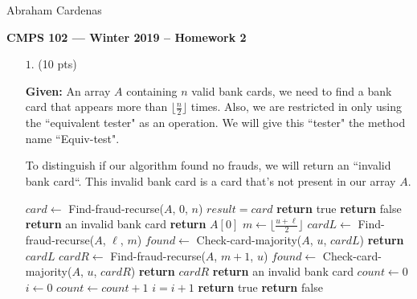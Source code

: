 \documentclass[11pt]{article}
\begin{document}
\hfill Abraham Cardenas

\begin{center}
{\bf\Large CMPS 102 --- Winter 2019 --  Homework 2}
\end{center}

\renewcommand{\P}{\mbox{IH}}

\begin{itemize}

\item[$1.$] (10 pts)

{\bf Given:} An array $A$ containing $n$ valid bank cards, we need to find a bank card that appears more than $\lfloor \frac{n}{2} \rfloor$ times. Also, we are restricted in only using the ``equivalent tester" as an operation. We will give this ``tester" the method name ``Equiv-test".

To distinguish if our algorithm found no frauds, we will return an ``invalid bank card``. This invalid bank card is a card that's not present in our array $A$.

\begin{algorithmic}[1]
 
	\State $card \gets$ Find-fraud-recurse($A$, 0, $n$)
		\State $result = card$
		\State \textbf{return} true
	\Else
		\State \textbf{return} false
	\EndIf
\EndFunction
{}
	\State \textbf{return} an invalid bank card 
	\State \textbf{return} $A[0]$
\Else
	\State ${m \gets \lfloor \frac{u + \ell}{2} \rfloor}$
	\State ${cardL \gets}$ Find-fraud-recurse($A$, $\ell$, $m$)
		\State $found \gets$ Check-card-majority($A$, $u$, $cardL$)
			\State \textbf{return} $cardL$
		\EndIf
	\EndIf
	\State ${cardR \gets}$ Find-fraud-recurse($A$, $m+1$, $u$)
			\State $found \gets$ Check-card-majority($A$, $u$, $cardR$)
				\State \textbf{return} $cardR$
			\EndIf
     	\EndIf
	\State \textbf{return} an invalid bank card
\EndIf
\EndFunction
{}
\State $count \gets 0$
\State $i \gets 0$
     		\State $count \gets count + 1$
     	\EndIf
     	\State $i = i + 1$
	\EndWhile
{}
	\State \textbf{return} true
\Else 
	\State \textbf{return} false
\EndIf
\EndFunction
\end{algorithmic}


\end{itemize}
\end{document}
